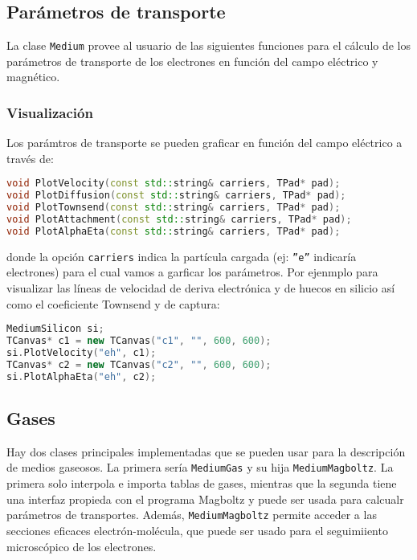 \subsection{Parámetros de transporte}

La clase \texttt{Medium} provee al usuario de las siguientes funciones para el cálculo de los parámetros de transporte de los electrones en función del campo eléctrico y magnético. 

\subsubsection{Visualización}

Los parámtros de transporte se pueden graficar en función del campo eléctrico a través de: \\

\begin{lstlisting}[language=C++,style=c++]
void PlotVelocity(const std::string& carriers, TPad* pad);
void PlotDiffusion(const std::string& carriers, TPad* pad);
void PlotTownsend(const std::string& carriers, TPad* pad);
void PlotAttachment(const std::string& carriers, TPad* pad);
void PlotAlphaEta(const std::string& carriers, TPad* pad);
\end{lstlisting}

\vspace*{0.7em}

donde la opción \texttt{carriers} indica la partícula cargada (ej: \texttt{''e''} indicaría electrones) para el cual vamos a garficar los parámetros.  Por ejenmplo para visualizar las líneas de velocidad de deriva electrónica y de huecos en silicio así como el coeficiente Townsend y de captura: \\

\begin{lstlisting}[language=C++,style=c++]
MediumSilicon si;
TCanvas* c1 = new TCanvas("c1", "", 600, 600);
si.PlotVelocity("eh", c1);
TCanvas* c2 = new TCanvas("c2", "", 600, 600);
si.PlotAlphaEta("eh", c2);
\end{lstlisting}

\vspace*{0.7em}

\subsection{Gases}

Hay dos clases principales implementadas que se pueden usar para la descripción de medios gaseosos. La primera sería \texttt{MediumGas} y su hija \texttt{MediumMagboltz}. La primera solo interpola e importa tablas de gases, mientras que la segunda tiene una interfaz propieda con el programa Magboltz y puede ser usada para calcualr parámetros de transportes. Además, \texttt{MediumMagboltz} permite acceder a las secciones eficaces electrón-molécula, que puede ser usado para el seguimiiento microscópico de los electrones. \\

